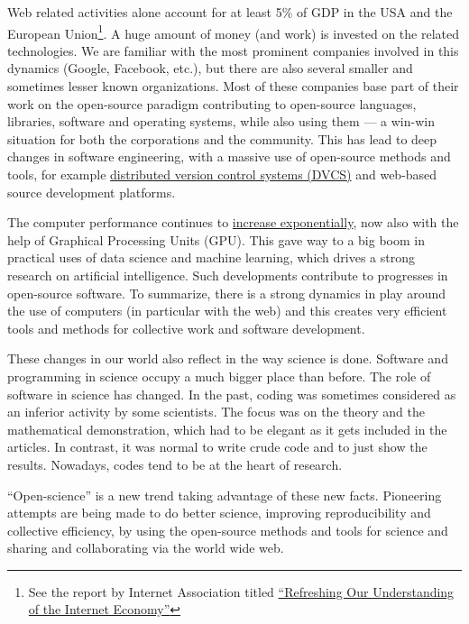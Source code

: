 \documentclass{../jors}
\begin{document}
Web related activities alone account for at least 5\% of GDP in the USA and the
European Union\footnote{See the report by Internet Association titled
\href{https://internetassociation.org/reports/refreshing-understanding-internet-economy-ia-report/}
{``Refreshing Our Understanding of the Internet Economy''}}.
A huge amount of money (and work) is invested on the related technologies. We
are familiar with the most prominent companies involved in this dynamics
(Google, Facebook, etc.), but there are also several smaller and sometimes
lesser known organizations.  Most of these companies base part of their work on
the open-source paradigm contributing to open-source languages, libraries,
software and operating systems, while also using them --- a win-win situation
for both the corporations and the community.
%
This has lead to deep changes in software engineering, with a massive use of
open-source methods and tools, for example
\href{https://en.wikipedia.org/wiki/Distributed_version_control}{distributed
version control systems (DVCS)} and web-based source development platforms.

The computer performance continues to
\href{https://en.wikipedia.org/wiki/Moore\%27s_law}{increase exponentially},
now also with the help of Graphical Processing Units (GPU). This gave way to a
big boom in practical uses of data science and machine learning, which drives a
strong research on artificial intelligence. Such developments contribute to
progresses in open-source software.
%
To summarize, there is a strong dynamics in play around the use of computers (in
particular with the web) and this creates very efficient tools and methods
for collective work and software development.

These changes in our world also reflect in the way science is done.
%
Software and programming in science occupy a much bigger place than before.
%
%
The role of software in science has changed. In the past, coding was sometimes
considered as an inferior activity by some scientists.  The focus was on the
theory and the mathematical demonstration, which had to be elegant as it gets
included in the articles.  In contrast, it was normal to write crude code and to
just show the results. Nowadays, codes tend to be at the heart of research.

``Open-science'' is a new trend taking advantage of these new facts.  Pioneering
attempts are being made to do better science, improving reproducibility and
collective efficiency, by using the open-source methods and tools for science
and sharing and collaborating via the world wide web.
\end{document}
